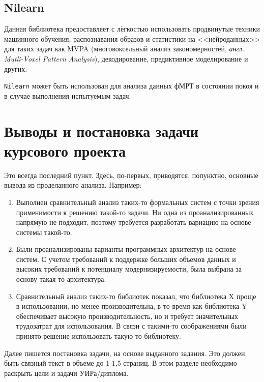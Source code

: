 \subsection{Nilearn}
Данная библиотека предоставляет с лёгкостью использовать продвинутые техники машинного обучения, распознавания образов и статистики на <<нейроданных>> для таких задач как MVPA (многовоксельный анализ закономерностей, \textit{англ. Mutli-Voxel Pattern Analysis}), декодирование, предиктивное моделирование и других.

\texttt{Nilearn} может быть использован для анализа данных фМРТ в состоянии покоя и в случае выполнения испытуемым задач.




\section{Выводы и постановка задачи курсового проекта}

Это всегда последний пункт. Здесь, по-первых, приводятся, попунктно, основные вывода из проделанного анализа. Например:

\begin{enumerate}
	\item Выполнен сравнительный анализ таких-то формальных систем с точки зрения применимости к решению такой-то задачи. Ни одна из проанализированных напрямую не подходит, поэтому требуется разработать вариацию на основе системы такой-то.
	\item Были проанализированы варианты программных архитектур на основе систем. С учетом требований к поддержке больших объемов данных и высоких требований к потенциалу модернизируемости, была выбрана за основу такая-то архитектура.
	\item Сравнительный анализ таких-то библиотек показал, что библиотека X проще в использовании, но менее производительна, в то время как библиотека Y обеспечивает высокую производительность, но и требует значительных трудозатрат для использования. В связи с такими-то соображениями были принято решение использовать такую-то библиотеку.
\end{enumerate}

Далее пишется постановка задачи, на основе выданного задания. Это должен быть связный текст в объеме до 1-1,5 страниц. В этом разделе необходимо раскрыть цели и задачи УИРа/диплома.